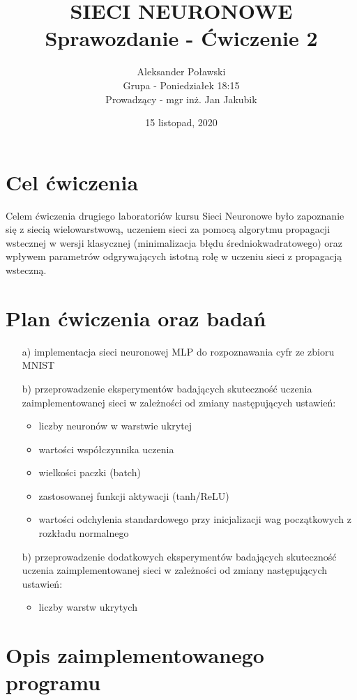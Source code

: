 \documentclass[17pt]{article}
\title{\textbf{SIECI NEURONOWE\\Sprawozdanie - Ćwiczenie 2}}
\author{Aleksander Poławski\\Grupa - Poniedziałek 18:15\\Prowadzący - mgr inż. Jan Jakubik}
\date{15 listopad, 2020}
\begin{document}
\maketitle	

\section{Cel ćwiczenia}
Celem ćwiczenia drugiego laboratoriów kursu Sieci Neuronowe było zapoznanie się z siecią wielowarstwową, uczeniem sieci za pomocą algorytmu propagacji wstecznej w wersji klasycznej (minimalizacja błędu średniokwadratowego) oraz wpływem parametrów odgrywających istotną rolę w uczeniu sieci z propagacją wsteczną.

\section{Plan ćwiczenia oraz badań}

\begin{enumerate}
\item[a)] implementacja sieci neuronowej MLP do rozpoznawania cyfr ze zbioru MNIST

\item[b)] przeprowadzenie eksperymentów badających skuteczność uczenia zaimplementowanej sieci w zależności od zmiany następujących ustawień:

\begin{itemize}
\item liczby neuronów w warstwie ukrytej
\item wartości współczynnika uczenia
\item wielkości paczki (batch)
\item zastosowanej funkcji aktywacji (tanh/ReLU)
\item wartości odchylenia standardowego przy inicjalizacji wag początkowych z rozkładu normalnego
\end{itemize}

\item[b)] przeprowadzenie dodatkowych eksperymentów badających skuteczność uczenia zaimplementowanej sieci w zależności od zmiany następujących ustawień:
\begin{itemize}
\item liczby warstw ukrytych
\end{itemize}
\end{enumerate}

\section{Opis zaimplementowanego programu}
\end{document}
